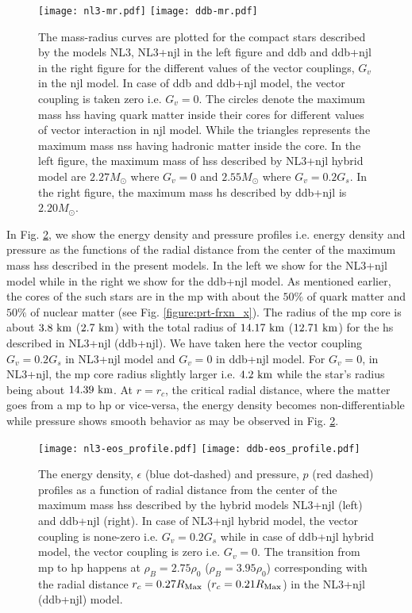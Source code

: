 \documentclass[a4paper, 11pt]{article}
\begin{document}
\begin{figure}
\centering
\texttt{[image: nl3-mr.pdf]}
\texttt{[image: ddb-mr.pdf]}
\caption{The mass-radius curves are plotted for the compact stars described by the models NL3, NL3+\ac{njl} in the left figure and \ac{ddb} and \ac{ddb}+\ac{njl} in the right figure for the different values of the vector couplings, $G_v$ in the \ac{njl} model. In case of \ac{ddb} and \ac{ddb}+\ac{njl} model, the vector coupling is taken zero i.e. $G_v=0$. The circles denote the maximum mass \ac{hs}s having quark matter inside their cores for different values of vector interaction in \ac{njl} model. While the triangles represents the maximum mass \ac{ns}s having hadronic matter inside the core. In the left figure, the maximum mass of \ac{hs}s described by NL3+\ac{njl} hybrid model are $2.27 M_{\odot}$ where $G_v=0$ and $2.55 M_{\odot}$ where $G_v=0.2 G_s$. In the right figure, the maximum mass \ac{hs} described by \ac{ddb}+\ac{njl} is $2.20 M_{\odot}$.}
\label{figure:mr}
\end{figure}

In Fig. \ref{figure:profile-e_p}, we show the energy density and pressure profiles i.e. energy density and pressure as the functions of the radial distance from the center of the maximum mass \ac{hs}s described in the present models. In  the left we show for the NL3+\ac{njl} model while in the right we show for the \ac{ddb}+\ac{njl} model. As mentioned earlier, the cores of the such stars are in the \ac{mp} with about the $50\%$ of quark matter and $50\%$ of nuclear matter (see Fig. \ref{figure:prt-frxn_x}). The radius of the \ac{mp} core is about $3.8\ {\rm km}$ ($2.7\ {\rm km}$) with the total radius of $14.17\ {\rm km}$ ($12.71\ {\rm km}$) for the \ac{hs} described in NL3+\ac{njl} (\ac{ddb}+\ac{njl}). We have taken here the vector coupling $G_v=0.2 G_s$ in NL3+\ac{njl} model and $G_v=0$ in \ac{ddb}+\ac{njl} model. For $G_v=0$, in NL3+\ac{njl}, the \ac{mp} core radius slightly larger i.e. $4.2\ {\rm km}$ while the star's radius being about $14.39\ {\rm km}$. At $r=r_c$, the critical radial distance, where the matter goes from a \ac{mp} to \ac{hp} or vice-versa, the energy density becomes non-differentiable while pressure shows smooth behavior as may be observed in Fig. \ref{figure:profile-e_p}.

\begin{figure}
\centering
\texttt{[image: nl3-eos\_profile.pdf]}
\texttt{[image: ddb-eos\_profile.pdf]}
\caption{The energy density, $\epsilon$ (blue dot-dashed) and pressure, $p$ (red dashed) profiles as a function of radial distance from the center of the maximum mass \ac{hs}s described by the hybrid models NL3+\ac{njl} (left) and \ac{ddb}+\ac{njl} (right). In case of NL3+\ac{njl} hybrid model, the vector coupling is none-zero i.e. $G_v=0.2 G_s$ while in case of \ac{ddb}+\ac{njl} hybrid model, the vector coupling is zero i.e. $G_v=0$. The transition from \ac{mp} to \ac{hp} happens at $\rho_B=2.75 \rho_0$ ($\rho_B=3.95 \rho_0$) corresponding with the radial distance  $r_c=0.27 R_{\rm Max}$ ($r_c=0.21 R_{\rm Max}$) in the NL3+\ac{njl} (\ac{ddb}+\ac{njl}) model.}
\label{figure:profile-e_p}
\end{figure}
\end{document}

